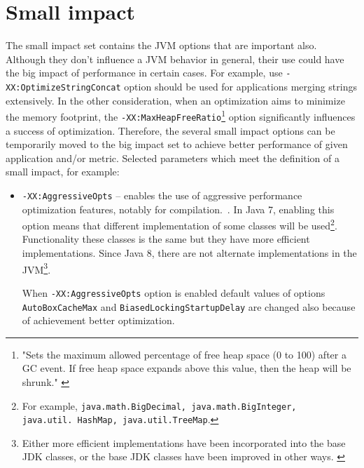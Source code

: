 \documentclass[
  digital, %
  oneside,
  notable, %
  nolof,     %
  nolot     %
]{fithesis3}
\begin{document}
\section{Small impact}
The small impact set contains the JVM options that are important also. Although they don't influence a JVM behavior in general, their use could have the big impact of performance in certain cases. For example, use \texttt{-XX:OptimizeStringConcat} option should be used for applications merging strings extensively. In the other consideration, when an optimization aims to minimize the memory footprint, the \texttt{-XX:MaxHeapFreeRatio}\footnote{"Sets the maximum allowed percentage of free heap space (0 to 100) after a GC event. If free heap space expands above this value, then the heap will be shrunk." \cite{java}} option significantly influences a success of optimization.
Therefore, the several small impact options can be temporarily moved to the big impact set to achieve better performance of given application and/or metric.
Selected parameters which meet the definition of a small impact, for example:
\begin{itemize}
	\item \texttt{-XX:AggressiveOpts} -- enables the use of aggressive performance optimization features, notably for compilation.~\cite{java}. In Java 7, enabling this option means that different implementation of some classes will be used\footnote{For example, \texttt{java.math.BigDecimal, java.math.BigInteger, java.util.\ HashMap, java.util.TreeMap}.}. Functionality these classes is the same but they have more efficient implementations. Since Java 8, there are not alternate implementations in the JVM\footnote{Either more efficient implementations have been incorporated into the base JDK classes, or the base JDK classes have been improved in other ways. \cite{scott}}.
	
	When \texttt{-XX:AggressiveOpts} option is enabled default values of options \texttt{AutoBoxCacheMax} and \texttt{BiasedLockingStartupDelay} are changed also because of achievement better optimization.
	
\end{itemize}
\end{document}
